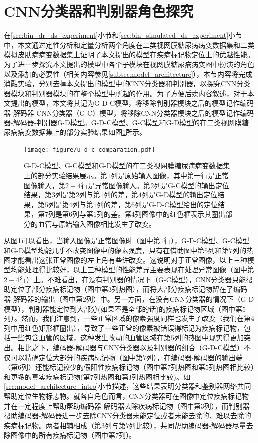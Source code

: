 \section{CNN分类器和判别器角色探究}\label{sec:g_c_g_d_g_d_c_comparsion}
在\ref{sec:bin_dr_ds_experiment}小节和\ref{sec:bin_simulated_ds_experiment}小节中，本文通过定性分析和定量分析两个角度在二类视网膜糖尿病病变数据集和二类模拟皮肤病病变数据集上证明了本文提出的模型在疾病标记物定位上的优越性能。为了进一步探究本文提出的模型中各个子模块在视网膜糖尿病病变图中扮演的角色以及添加的必要性（相关内容参见\ref{subsec:model_architecture}），本节内容将完成消融实验，分别去掉本文提出的模型中的CNN分类器和判别器，以探究CNN分类器模块和判别器模块的在整个模型中所起的作用。为了方便后续内容叙述，对于本文提出的模型，本文将其记为G-D-C模型，将移除判别器模块之后的模型记作编码器-解码器-CNN分类器（G-C）模型，将移除CNN分类器模块之后的模型记作编码器-解码器-判别器G-D模型。G-D-C模型、G-C模型和G-D模型的在二类视网膜糖尿病病变数据集上的部分实验结果如图\ref{fig:u_d_c_comparation}所示。
\begin{figure}[h]
	\centering
	\texttt{[image: figure/u\_d\_c\_comparation.pdf]}
	\caption{G-D-C模型、G-C模型和G-D模型的在二类视网膜糖尿病病变数据集上的部分实验结果展示。第$1$列是原始输入图像，其中第一行是正常图像输入，第$2-4$行是异常图像输入。第$2$列是G-C模型的输出定位结果，第$3$列是第$2$列与第$1$列的差，第$4$列是G-D模型的输出定位结果，第$5$列是第$4$列与第$1$列的差，第$6$列是G-D-C模型给出的定位结果，第$7$列是第$6$列与第$1$列的差。第$4$列图像中的红色框表示其圈出部分的血管与原始输入图像相比发生了改变。} 
	\label{fig:u_d_c_comparation}
\end{figure}

从图\ref{fig:u_d_c_comparation}可以看出，当输入图像是正常图像时（图中第$1$行），G-D-C模型、G-C模型和G-D模型均能几乎不改变图像中的像素强度，只有在借助图中第$5$列和第$7$列的热图才能看出这张正常图像的左上角有些许改变。这说明对于正常图像，以上三种模型均能处理得比较好，以上三种模型的性能差异主要表现在处理异常图像（图中第$2-4$行）上。不难看出，在没有判别器的情况下（G-C模型），CNN分类器只能帮助定位了部分疾病标记物（图中第$3$列热图），而将大部分疾病标记物留在了编码器-解码器的输出（图中第$2$列）中。另一方面，在没有CNN分类器的情况下（G-D模型），判别器能定位到大部分(如果不是全部的话)的疾病标记物区域（图中第$5$列）。然而，我们注意到，一些正常区域的像素强度同样也发生了改变（我们在第$4$列中用红色矩形框圈出），导致了一些正常的像素被错误得标记为疾病标记物，包括一些包含血管的区域，这种发生改动的血管区域在第$5$列的热图中现实得更加突出。相比之下，编码器-解码器与CNN分类器以及判别器的组合（G-D-C模型）不仅可以精确定位大部分的疾病标记物（图中第$7$列），在编码器-解码器的输出端（第$6$列）还能标记较少的假阳性疾病标记物（图中第$7$列热图和第$5$列热图相比较）和更多的真实疾病标记物(第$7$列热图和第$3$列热图相比较)。如\ref{sec:model_architecture_intro}小节描述，这些结果表明分类器和鉴别器网络共同帮助定位生物标志物。就各自角色而言，CNN分类器可在图像中定位疾病标记物并在一定程度上帮助帮助编码器-解码器去除疾病标记物（图中第$3$列），而判别器帮助编码器-解码器进一步去除CNN分类器未能定位或者未能去除的、难以去除的疾病标记物。两者相辅相成（第$3$列与第$7$列比较），共同帮助编码器-解码器尽量去除图像中的所有疾病标记物（图中第$7$列）。

